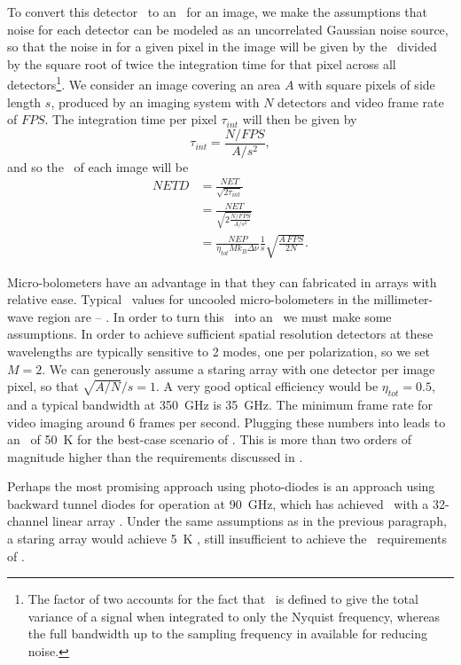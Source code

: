 To convert this detector \NET\ to an \NETD\ for an image, we make the assumptions that noise for each detector can be modeled as an uncorrelated Gaussian noise source, so that the noise in for a given pixel in the image will be given by the \NET\ divided by the square root of twice the integration time for that pixel across all detectors\footnote{%
  The factor of two accounts for the fact that \NEP\ is defined to give the total variance of a signal when integrated to only the Nyquist frequency, whereas the full bandwidth up to the sampling frequency in available for reducing noise.
}. 
We consider an image covering an area $A$ with square pixels of side length $s$, produced by an imaging system with $N$ detectors and video frame rate of $FPS$.
The integration time per pixel $\tau_{int}$ will then be given by
\begin{equation}
  \tau_{int} = \frac{N / FPS}{A / s^2},
\end{equation}
and so the \NETD\ of each image will be
\begin{align}
  NETD & = \frac{NET}{\sqrt{2\tau_{int}}} \\
       & = \frac{NET}{\sqrt{ 2 \frac{N / FPS}{A / s^2}}} \\
       & = \frac{NEP}{\eta_{tot} M k_B \Delta \nu} \frac{1}{s} \sqrt{\frac{A\,FPS}{2 N}} .
       \label{eqn:ch1-netd-defn}
\end{align}

Micro-bolometers have an advantage in that they can fabricated in arrays with relative ease.
Typical \NEP\ values for uncooled micro-bolometers in the millimeter-wave region are -- \cite{nemarich_microbolometer_2005,rogalski_terahertz_2011}.
In order to turn this \NEP\ into an \NETD\ we must make some assumptions.
In order to achieve sufficient spatial resolution detectors at these wavelengths are typically sensitive to 2 modes, one per polarization, so we set $M = 2$.
We can generously assume a staring array with one detector per image pixel, so that $\sqrt{A/N}/s = 1$.
A very good optical efficiency would be $\eta_{tot} = 0.5$, and a typical bandwidth at \SI{350}{\GHz} is \SI{35}{\GHz}.
The minimum frame rate for video imaging around 6 frames per second.
Plugging these numbers into  leads to an \NETD\ of \SI{50}{\K} for the best-case scenario of  \NEP.
This is more than two orders of magnitude higher than the requirements discussed in .

Perhaps the most promising approach using photo-diodes is an approach using backward tunnel diodes for operation at \SI{90}{\GHz}, which has achieved  \NEP\ with a 32-channel linear array \cite{schaffner_wideband_2008,wikner_demonstration_2009}.
Under the same assumptions as in the previous paragraph, a staring array would achieve \SI{5}{\K} \NETD, still insufficient to achieve the \NETD\ requirements of .

